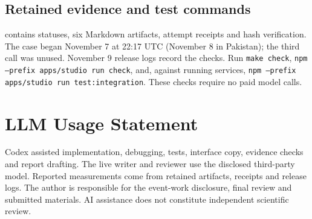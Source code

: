 \documentclass[11pt,letterpaper]{article}
\begin{document}
\subsection*{Retained evidence and test commands}
 contains statuses, six Markdown artifacts, attempt receipts and hash verification. The case began November 7 at 22:17 UTC (November 8 in Pakistan); the third call was unused. November 9 release logs record the checks. Run \texttt{make check}, \texttt{npm --prefix apps/studio run check}, and, against running services, \texttt{npm --prefix apps/studio run test:integration}. These checks require no paid model calls.

\section{LLM Usage Statement}
Codex assisted implementation, debugging, tests, interface copy, evidence checks and report drafting. The live writer and reviewer use the disclosed third-party model. Reported measurements come from retained artifacts, receipts and release logs. The author is responsible for the event-work disclosure, final review and submitted materials. AI assistance does not constitute independent scientific review.
\end{document}
